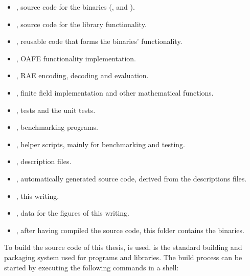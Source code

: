 \begin{itemize}

  \item {}, source code for the binaries (\JWBpOne{},
    \JWBpTwo{} and \JWBtoken{}).

  \item {}, source code for the library functionality.

  \item {}, reusable code that forms the binaries'
    functionality.

  \item {}, OAFE functionality implementation.

  \item {}, RAE encoding, decoding and evaluation.

  \item {}, finite field implementation and other
    mathematical functions.

  \item {}, \JWTquickcheck{} tests and the unit tests.

  \item {}, benchmarking programs.

  \item {}, helper scripts, mainly for benchmarking and testing.

  \item {}, \JWTprotobuf{} description files.

  \item {}, automatically generated source code, derived from the
    \JWTprotobuf{} descriptions files.

  \item {}, this writing.

  \item {}, data for the figures of this writing.

  \item {}, after having compiled the source code, this folder
    contains the binaries.

\end{itemize}



To build the source code of this thesis, \JWTLcabal{} is used. \JWTcabal{}
is the standard building and packaging system used for \JWThaskell{} programs
and libraries. The build process can be started by executing the following
commands in a shell:

